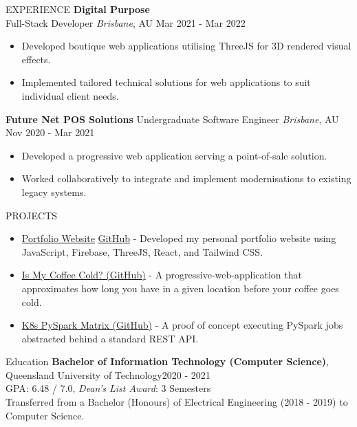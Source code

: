 \documentclass{resume}
\begin{document}
\begin{rSection}{EXPERIENCE}
      \textbf{Digital Purpose}\\
      Full-Stack Developer \hfill \textit{Brisbane}, AU \textbar\space Mar 2021 - Mar 2022
      \begin{itemize}
         \item Developed boutique web applications utilising ThreeJS for 3D rendered visual effects.
         \item Implemented tailored technical solutions for web applications to suit individual client needs.
      \end{itemize}
      
      \textbf{Future Net POS Solutions}
      Undergraduate Software Engineer \hfill \textit{Brisbane}, AU \textbar\space Nov 2020 - Mar 2021
      \begin{itemize}
         \item Developed a progressive web application serving a point-of-sale solution.
         \item Worked collaboratively to integrate and implement modernisations to existing legacy systems.
      \end{itemize}
   \end{rSection} 

   \begin{rSection}{PROJECTS}
      \begin{itemize}
         \item \href{https://jim-t-kelly.web.app/}{Portfolio Website} \textbar\space \href{https://github.com/jamestkelly/personal-portfolio}{GitHub} - Developed my personal portfolio website using JavaScript, Firebase, ThreeJS, React, and Tailwind CSS.
         \item \href{https://github.com/jamestkelly/is-my-coffee-cold}{Is My Coffee Cold? (GitHub)} - A progressive-web-application that approximates how long you have in a given location before your coffee goes cold.
         \item \href{https://github.com/jamestkelly/K8s-PySpark-Matrix}{K8s PySpark Matrix (GitHub)} - A proof of concept executing PySpark jobs abstracted behind a standard REST API.
      \end{itemize}
   \end{rSection} 

   \begin{rSection}{Education}
      {\bf Bachelor of Information Technology (Computer Science)}, Queensland University of Technology\hfill {2020 - 2021}\\
      GPA: 6.48 / 7.0, \textit{Dean's List Award}: 3 Semesters\\
      Transferred from a Bachelor (Honours) of Electrical Engineering (2018 - 2019) to Computer Science.
   \end{rSection}
\end{document}
